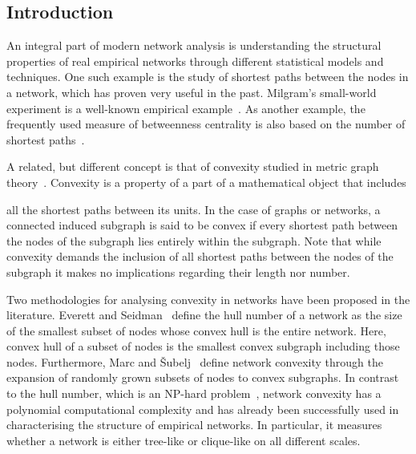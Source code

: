 \documentclass[]{rsif}
\begin{document}
\begin{fmtext} \section{\label{sec:intro}Introduction}

An integral part of modern network analysis is understanding the structural properties of real empirical networks through different statistical models and techniques. One such example is the study of shortest paths between the nodes in a network, which has proven very useful in the past. Milgram's small-world experiment is a well-known empirical example~\cite{Mil67}. As another example, the frequently used measure of betweenness centrality is also based on the number of shortest paths~\cite{Fre77}.

A related, but different concept is that of convexity studied in metric graph theory~\cite{HN81,FJ86,Van93,Pel13}. Convexity is a property of a part of a mathematical object that includes

\end{fmtext} \maketitle

\noindent all the shortest paths between its units. In the case of graphs or networks, a connected induced subgraph is said to be convex if every shortest path between the nodes of the subgraph lies entirely within the subgraph. Note that while convexity demands the inclusion of all shortest paths between the nodes of the subgraph it makes no implications regarding their length nor number.

Two methodologies for analysing convexity in networks have been proposed in the literature. Everett and Seidman~\cite{ES85} define the hull number of a network as the size of the smallest subset of nodes whose convex hull is the entire network. Here, convex hull of a subset of nodes is the smallest convex subgraph including those nodes. Furthermore, Marc and \v{S}ubelj~\cite{MS18} define network convexity through the expansion of randomly grown subsets of nodes to convex subgraphs. In contrast to the hull number, which is an NP-hard problem~\cite{DGKPS09}, network convexity has a polynomial computational complexity and has already been successfully used in characterising the structure of empirical networks. In particular, it measures whether a network is either tree-like or clique-like on all different scales.
\end{document}
